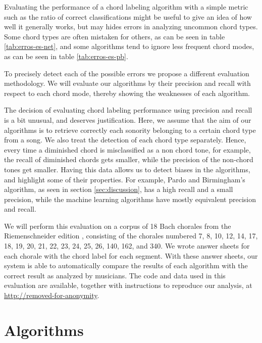 \documentclass{article}
\begin{document}
Evaluating the performance of a chord labeling algorithm with a simple
metric such as the ratio of correct classifications might be useful to
give an idea of how well it generally works, but may hides errors in
analyzing uncommon chord types. Some chord types are often mistaken
for others, as can be seen in table \ref{tab:erros-es-net}, and some
algorithms tend to ignore less frequent chord modes, as can be seen in
table \ref{tab:erros-es-pb}.

To precisely detect each of the possible errors we propose a different
evaluation methodology. We will evaluate our algorithms by their
precision and recall with respect to each chord mode, thereby showing
the weaknesses of each algorithm.

The decision of evaluating chord labeling performance using precision
and recall is a bit unusual, and deserves justification. Here, we
assume that the aim of our algorithms is to retrieve correctly each
sonority belonging to a certain chord type from a song. We also treat
the detection of each chord type separately. Hence, every time a
diminished chord is misclassified as a non chord tone, for example,
the recall of diminished chords gets smaller, while the precision of
the non-chord tones get smaller. Having this data allows us to detect
biases in the algorithms, and highlight some of their properties. For
example, Pardo and Birmingham's algorithm, as seen in section
\ref{sec:discussion}, has a high recall and a small precision, while
the machine learning algorithms have mostly equivalent precision and
recall.

We will perform this evaluation on a corpus of 18 Bach chorales from
the Riemenschneider edition \cite{bach41:371}, consisting of the
chorales numbered 7, 8, 10, 12, 14, 17, 18, 19, 20, 21, 22, 23, 24,
25, 26, 140, 162, and 340. We wrote answer sheets for each chorale
with the chord label for each segment. With these answer sheets, our
system is able to automatically compare the results of each algorithm
with the correct result as analyzed by musicians. The code and data
used in this evaluation are available, together with instructions to
reproduce our analysis, at \url{http://removed-for-anonymity}.

\section{Algorithms}
\label{sec:algorithms}
\end{document}
